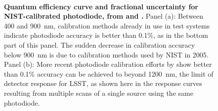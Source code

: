 \documentclass[12pt,preprint]{aastex}
\begin{document}
\begin{figure}
\centering
{} \\
\caption{{\small
{\bf Quantum efficiency curve and fractional uncertainty for
NIST-calibrated photodiode, from \citet{Stubbs2010a} and
\citet{Eppeldauer09}.}  Panel (a): Between 400 and 900~nm, calibration
methods already in use in test systems indicate photodiode accuracy is
better than 0.1\%, as in the bottom part of this panel.  The sudden
decrease in calibration accuracy below 900~nm is due to calibration
methods used by NIST in 2005. Panel (b): More recent photodiode
calibration efforts by \citet{Eppeldauer09} show better than 0.1\%
accuracy can be achieved to beyond 1200~nm, the limit of detector
response for LSST, as shown here in the response curves resulting from
multiple scans of a single source using the same photodiode.} }
\label{fig:NIST_diode}
\end{figure}
\end{document}
